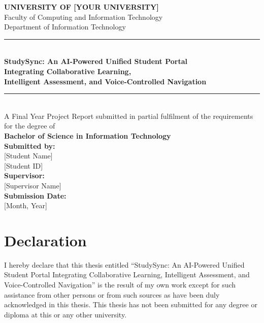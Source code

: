 \documentclass[12pt,a4paper]{report}
\begin{document}
\begin{titlepage}
\begin{center}
\vspace*{1cm}
{\Large \textbf{UNIVERSITY OF [YOUR UNIVERSITY]}}\\[0.5cm]
{\large Faculty of Computing and Information Technology}\\[0.3cm]
{\large Department of Information Technology}\\[1.5cm]

\rule{\linewidth}{0.5mm}\\[0.5cm]
{\huge \textbf{StudySync: An AI-Powered Unified Student Portal\\ Integrating Collaborative Learning,\\ Intelligent Assessment, and Voice-Controlled Navigation}}\\[0.4cm]
\rule{\linewidth}{0.5mm}\\[1.5cm]

{\large A Final Year Project Report submitted in partial fulfilment of the requirements for the degree of}\\[0.5cm]
{\Large \textbf{Bachelor of Science in Information Technology}}\\[2cm]

{\large \textbf{Submitted by:}}\\[0.3cm]
{\large [Student Name]}\\[0.2cm]
{\large [Student ID]}\\[1.5cm]

{\large \textbf{Supervisor:}}\\[0.3cm]
{\large [Supervisor Name]}\\[1.5cm]

{\large \textbf{Submission Date:}}\\[0.3cm]
{\large [Month, Year]}\\

\end{center}
\end{titlepage}

\newpage
\chapter*{Declaration}

I hereby declare that this thesis entitled ``StudySync: An AI-Powered Unified Student Portal Integrating Collaborative Learning, Intelligent Assessment, and Voice-Controlled Navigation'' is the result of my own work except for such assistance from other persons or from such sources as have been duly acknowledged in this thesis. This thesis has not been submitted for any degree or diploma at this or any other university.
\end{document}

